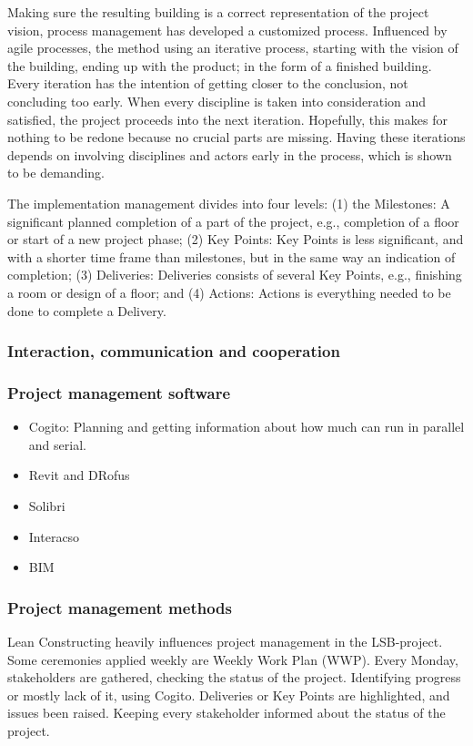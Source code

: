 Making sure the resulting building is a correct representation of the project vision, process management has developed a customized process. Influenced by agile processes, the method using an iterative process, starting with the vision of the building, ending up with the product; in the form of a finished building. Every iteration has the intention of getting closer to the conclusion, not concluding too early. When every discipline is taken into consideration and satisfied, the project proceeds into the next iteration. Hopefully, this makes for nothing to be redone because no crucial parts are missing. Having these iterations depends on involving disciplines and actors early in the process, which is shown to be demanding.

The implementation management divides into four levels: (1) the Milestones: A significant planned completion of a part of the project, e.g., completion of a floor or start of a new project phase; (2) Key Points: Key Points is less significant, and with a shorter time frame than milestones, but in the same way an indication of completion; (3) Deliveries: Deliveries consists of several Key Points, e.g., finishing a room or design of a floor; and (4) Actions: Actions is everything needed to be done to complete a Delivery. 

\subsubsection{Interaction, communication and cooperation}

\subsubsection{Project management software}

\begin{itemize}
    \item Cogito: Planning and getting information about how much can run in parallel and serial. 
    \item Revit and DRofus
    \item Solibri
    \item Interacso
    \item BIM
\end{itemize}
 
\subsubsection{Project management methods} 
Lean Constructing heavily influences project management in the LSB-project. Some ceremonies applied weekly are Weekly Work Plan (WWP). Every Monday, stakeholders are gathered, checking the status of the project. Identifying progress or mostly lack of it, using Cogito. Deliveries or Key Points are highlighted, and issues been raised. Keeping every stakeholder informed about the status of the project. 


\cleardoublepage